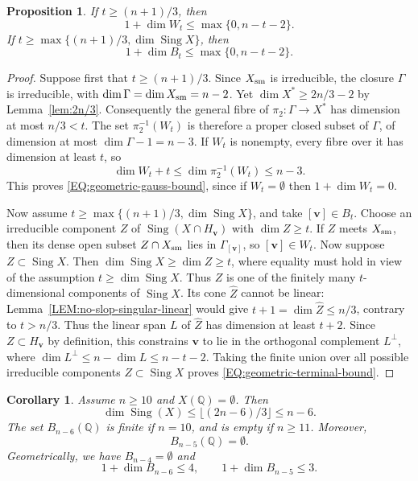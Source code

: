 \documentclass[a4paper,11pt, twoside,reqno]{amsart}
\theoremstyle{plain}
\newtheorem{cor}[thm]{Corollary}
\newtheorem{prop}[thm]{Proposition}
\theoremstyle{definition}
\theoremstyle{remark}
\newcommand{\bfv}{\bm{v}}
\newcommand{\QQ}{\mathbb{Q}}
\DeclareMathOperator{\sing}{Sing}
\DeclareMathOperator{\Sing}{Sing}
\renewcommand{\le}{\leqslant}
\renewcommand{\leq}{\leqslant}
\renewcommand{\ge}{\geqslant}
\newcommand{\cone}{\widehat}
\numberwithin{equation}{section}
\begin{document}
\begin{prop}
\label{PROP:geometric-exceptional-hyperplanes-general}
If $t\ge (n+1)/3$, then
\begin{equation}
1+\dim W_t\le\max\{0,n-t-2\}.
\label{EQ:geometric-gauss-bound}
\end{equation}
If $t\ge \max\{(n+1)/3,\dim\sing X\}$, then
\begin{equation}
1+\dim B_t\le\max\{0,n-t-2\}.
\label{EQ:geometric-terminal-bound}
\end{equation}
\end{prop}

\begin{proof}
Suppose first that $t\ge (n+1)/3$.
Since $X_{\rm sm}$ is irreducible,
the closure $\Gamma$ is irreducible,
with $\dim \Gamma = \dim X_{\rm sm} = n-2$.
Yet $\dim X^* \ge 2n/3-2$ by Lemma~\ref{lem:2n/3}.
Consequently the general fibre of $\pi_2\colon \Gamma\to X^*$ has dimension
at most $n/3<t$.
The set $\pi_2^{-1}(W_t)$ is therefore a proper closed
subset of $\Gamma$, of dimension at most $\dim \Gamma - 1 = n-3$.
If $W_t$ is nonempty, every fibre over it has dimension
at least $t$, so
\[
\dim W_t+t
\le \dim \pi_2^{-1}(W_t)
\le n-3.
\]
This proves \eqref{EQ:geometric-gauss-bound},
since if $W_t = \emptyset$ then $1 + \dim W_t = 0$.

Now assume $t\ge \max\{(n+1)/3,\dim\sing X\}$, and take $[\bfv]\in B_t$.
Choose an irreducible component $Z$ of $\sing(X\cap H_{\bfv})$
with $\dim Z\ge t$.
If $Z$ meets $X_{\rm sm}$, then its dense open subset $Z\cap X_{\rm sm}$ lies in
$\Gamma_{[\bfv]}$, so $[\bfv]\in W_t$.
Now suppose $Z \subset \sing X$.
Then $\dim\sing X \ge \dim Z \ge t$,
where equality must hold in view of the assumption $t \ge \dim\sing X$.
Thus $Z$ is one of the
finitely many $t$-dimensional components of $\sing X$.
Its cone $\cone Z$ cannot be linear: Lemma~\ref{LEM:no-slop-singular-linear}
would give $t+1 = \dim \cone Z \le n/3$, contrary to $t>n/3$.
Thus the linear span $L$ of $\cone Z$ has dimension at least $t+2$.
Since $Z \subset H_{\bfv}$ by definition,
this constrains $\bfv$ to lie in the orthogonal complement $L^\perp$,
where $\dim L^\perp \le n-\dim L \le n-t-2$.
Taking the finite union over all possible
irreducible components $Z \subset \sing X$
proves \eqref{EQ:geometric-terminal-bound}.
\end{proof}

\begin{cor}\label{COR:general-n-exceptional-hyperplanes}
Assume $n\ge10$ and $X(\QQ)=\emptyset$.
Then
\begin{equation}
\label{eq:n10-sing-X}
\dim\Sing(X)\leq \lfloor(2n-6)/3\rfloor \le n-6.
\end{equation}
The set $B_{n-6}(\QQ)$ is finite if $n=10$,
and is empty if $n\ge11$. Moreover,
\begin{equation}\label{eq:rational-terminal-hyperplanes}
B_{n-5}(\QQ)=\emptyset.
\end{equation}
Geometrically, we have $B_{n-4} = \emptyset$ and
\begin{equation}\label{eq:terminal-hyperplane-dimensions}
1+\dim B_{n-6}\le4,
\qquad
1+\dim B_{n-5}\le3.
\end{equation}
\end{cor}
\end{document}
